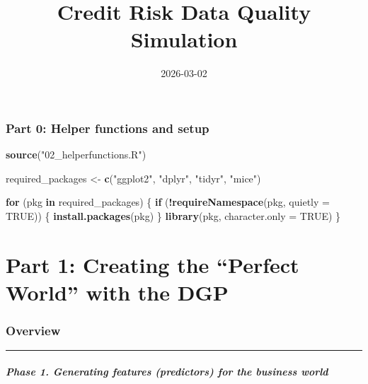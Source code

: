 \documentclass[
]{article}
\title{Credit Risk Data Quality Simulation}
\author{}
\date{\vspace{-2.5em}2026-03-02}
\newenvironment{Shaded}{\begin{snugshade}}{\end{snugshade}}
\newcommand{\AttributeTok}[1]{\textcolor[rgb]{0.13,0.29,0.53}{#1}}
\newcommand{\ConstantTok}[1]{\textcolor[rgb]{0.56,0.35,0.01}{#1}}
\newcommand{\ControlFlowTok}[1]{\textcolor[rgb]{0.13,0.29,0.53}{\textbf{#1}}}
\newcommand{\FunctionTok}[1]{\textcolor[rgb]{0.13,0.29,0.53}{\textbf{#1}}}
\newcommand{\NormalTok}[1]{#1}
\newcommand{\OtherTok}[1]{\textcolor[rgb]{0.56,0.35,0.01}{#1}}
\newcommand{\SpecialCharTok}[1]{\textcolor[rgb]{0.81,0.36,0.00}{\textbf{#1}}}
\newcommand{\StringTok}[1]{\textcolor[rgb]{0.31,0.60,0.02}{#1}}
\begin{document}
\maketitle

\subsubsection{Part 0: Helper functions and
setup}\label{part-0-helper-functions-and-setup}

\begin{Shaded}
\begin{Highlighting}[]
\FunctionTok{source}\NormalTok{(}\StringTok{"02\_helperfunctions.R"}\NormalTok{)}

\NormalTok{required\_packages }\OtherTok{\textless{}{-}} \FunctionTok{c}\NormalTok{(}\StringTok{"ggplot2"}\NormalTok{, }\StringTok{"dplyr"}\NormalTok{, }\StringTok{"tidyr"}\NormalTok{, }\StringTok{"mice"}\NormalTok{)}

\ControlFlowTok{for}\NormalTok{ (pkg }\ControlFlowTok{in}\NormalTok{ required\_packages) \{}
  \ControlFlowTok{if}\NormalTok{ (}\SpecialCharTok{!}\FunctionTok{requireNamespace}\NormalTok{(pkg, }\AttributeTok{quietly =} \ConstantTok{TRUE}\NormalTok{)) \{}
    \FunctionTok{install.packages}\NormalTok{(pkg)}
\NormalTok{  \}}
  \FunctionTok{library}\NormalTok{(pkg, }\AttributeTok{character.only =} \ConstantTok{TRUE}\NormalTok{)}
\NormalTok{\}}
\end{Highlighting}
\end{Shaded}

\section{\texorpdfstring{\textbf{Part 1: Creating the ``Perfect World''
with the
DGP}}{Part 1: Creating the ``Perfect World'' with the DGP}}\label{part-1-creating-the-perfect-world-with-the-dgp}

\subsubsection{Overview}\label{overview}

\begin{center}\rule{0.5\linewidth}{0.5pt}\end{center}

\subparagraph{\texorpdfstring{\textbf{Phase 1. Generating features
(predictors) for the business
world}}{Phase 1. Generating features (predictors) for the business world}}\label{phase-1.-generating-features-predictors-for-the-business-world}
\end{document}
